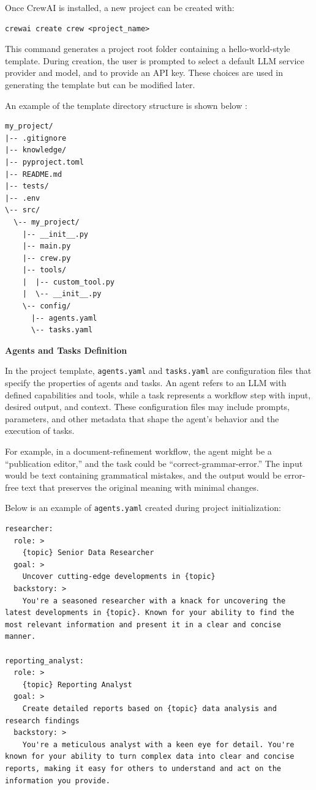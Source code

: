 Once CrewAI is installed, a new project can be created with:
\begin{lstlisting}
crewai create crew <project_name>
\end{lstlisting}

This command generates a project root folder containing a hello-world-style template. During creation, the user is prompted to select a default LLM service provider and model, and to provide an API key. These choices are used in generating the template but can be modified later.

An example of the template directory structure is shown below \cite{crewai2025install}:
\begin{lstlisting}
my_project/
|-- .gitignore
|-- knowledge/
|-- pyproject.toml
|-- README.md
|-- tests/
|-- .env
\-- src/
  \-- my_project/
    |-- __init__.py
    |-- main.py
    |-- crew.py
    |-- tools/
    |  |-- custom_tool.py
    |  \-- __init__.py
    \-- config/
      |-- agents.yaml
      \-- tasks.yaml
\end{lstlisting}

\vspace{0.1in}
\noindent \textbf{Agents and Tasks Definition}
\vspace{0.1in}

In the project template, \verb|agents.yaml| and \verb|tasks.yaml| are configuration files that specify the properties of agents and tasks. An agent refers to an LLM with defined capabilities and tools, while a task represents a workflow step with input, desired output, and context. These configuration files may include prompts, parameters, and other metadata that shape the agent’s behavior and the execution of tasks.

For example, in a document-refinement workflow, the agent might be a ``publication editor,'' and the task could be ``correct-grammar-error.'' The input would be text containing grammatical mistakes, and the output would be error-free text that preserves the original meaning with minimal changes.

Below is an example of \verb|agents.yaml| created during project initialization:
\begin{lstlisting}
researcher:
  role: >
    {topic} Senior Data Researcher
  goal: >
    Uncover cutting-edge developments in {topic}
  backstory: >
    You're a seasoned researcher with a knack for uncovering the latest developments in {topic}. Known for your ability to find the most relevant information and present it in a clear and concise manner.

reporting_analyst:
  role: >
    {topic} Reporting Analyst
  goal: >
    Create detailed reports based on {topic} data analysis and research findings
  backstory: >
    You're a meticulous analyst with a keen eye for detail. You're known for your ability to turn complex data into clear and concise reports, making it easy for others to understand and act on the information you provide.
\end{lstlisting}

